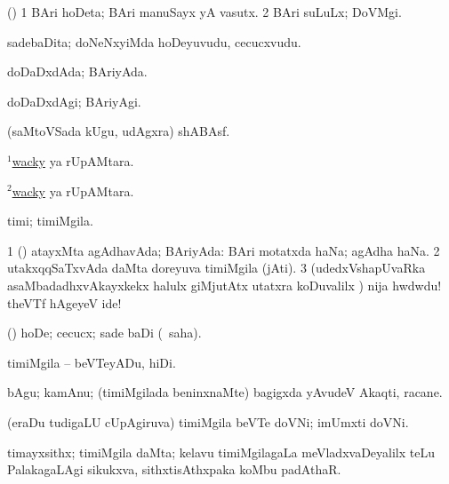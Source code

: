 \bentry
{} 
\gl{\nA}
\expl{}
\bmng
(\ashi) 
\bnum
\num{1} BAri hoDeta; BAri manuSayx yA vasutx. 
\num{2} BAri suLuLx; DoVMgi. 
\enum
\emng
\eentry

\bentry
{} 
\gl{\nA}
\expl{}
\bmng
sadebaDita; doNeNxyiMda hoDeyuvudu, cecucxvudu. 
\emng
\eentry

\bentry
{} 
\gl{\gu}
\expl{}
\bmng
doDaDxdAda; BAriyAda. 
\emng
\eentry

\bentry
{} 
\gl{\kirxvi}
\expl{}
\bmng
doDaDxdAgi; BAriyAgi. 
\emng
\eentry

\bentry
{} 
\gl{\BAavayx}
\expl{}
\bmng
(saMtoVSada kUgu, udAgxra) shABAsf. 
\emng
\eentry

\bentry
{} 
\gl{\gu}
\expl{}
\bmng
\hyperlink{wacky(1)}{$^1$wacky} ya rUpAMtara. 
\emng
\eentry

\bentry
{} 
\gl{\nA}
\expl{}
\bmng
\hyperlink{wacky(2)}{$^2$wacky} ya rUpAMtara. 
\emng
\eentry

\bentry
{} 
\gl{\nA}
\bmng
timi; timiMgila. 
\emng

\noindent 
\gl{\pagu}
\expl{}
\bmng
\bnum
\num{1}  (\AmA) atayxMta agAdhavAda; BAriyAda:  BAri motatxda haNa; agAdha haNa. 
\num{2}  utakxqqSaTxvAda daMta doreyuva timiMgila (jAti). 
\num{3}  (udedxVshapUvaRka asaMbadadhxvAkayxkekx halulx giMjutAtx utatxra koDuvalilx \parx) nija hwdwdu! theVTf hAgeyeV ide! 
\enum
\emng
\eentry

\bentry
{} 
\gl{\sakirx}
\expl{}
\bmng
(\AmA) hoDe; cecucx; sade baDi (\akirx\ saha). 
\emng

\noindent 
\gl{\akirx}
\expl{}
\bmng
timiMgila -- beVTeyADu, hiDi. 
\emng
\eentry

\bentry
{} 
\gl{\nA}
\expl{}
\bmng
bAgu; kamAnu; (timiMgilada beninxnaMte) bagigxda yAvudeV Akaqti, racane. 
\emng
\eentry

\bentry
{} 
\gl{\nA}
\expl{}
\bmng
(eraDu tudigaLU cUpAgiruva) timiMgila beVTe doVNi; imUmxti doVNi. 
\emng
\eentry

\bentry
{} 
\gl{\nA}
\expl{}
\bmng
timayxsithx; timiMgila daMta; kelavu timiMgilagaLa meVladxvaDeyalilx teLu PalakagaLAgi sikukxva, sithxtisAthxpaka koMbu padAthaR. 
\emng
\eentry

